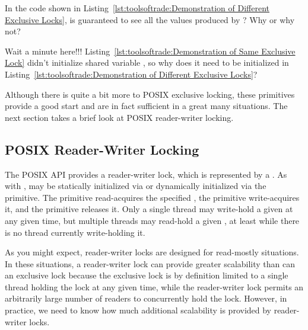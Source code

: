 \QuickQuiz{}
	In the code shown in
	Listing~\ref{lst:toolsoftrade:Demonstration of Different Exclusive Locks},
	is  guaranteed to see all the values produced
	by ?
	Why or why not?
 \QuickQuizEnd

\QuickQuiz{}
	Wait a minute here!!!
	Listing~\ref{lst:toolsoftrade:Demonstration of Same Exclusive Lock}
	didn't initialize shared variable ,
	so why does it need to be initialized in
	Listing~\ref{lst:toolsoftrade:Demonstration of Different Exclusive Locks}?
 \QuickQuizEnd

Although there is quite a bit more to POSIX exclusive locking, these
primitives provide a good start and are in fact sufficient in a great
many situations.
The next section takes a brief look at POSIX reader-writer locking.

\subsection{POSIX Reader-Writer Locking}
\label{sec:toolsoftrade:POSIX Reader-Writer Locking}

The POSIX API provides a reader-writer lock, which is represented by
a .
As with ,  may be statically
initialized via  or dynamically
initialized via the  primitive.
The  primitive read-acquires the
specified , the 
primitive write-acquires it, and the 
primitive releases it.
Only a single thread may write-hold a given 
at any given time, but multiple threads may read-hold a given
, at least while there is no thread
currently write-holding it.

As you might expect, reader-writer locks are designed for read-mostly
situations.
In these situations, a reader-writer lock can provide greater scalability
than can an exclusive lock because the exclusive lock is by definition
limited to a single thread holding the lock at any given time, while
the reader-writer lock permits
an arbitrarily large number of readers to concurrently hold the lock.
However, in practice, we need to know how much additional scalability is
provided by reader-writer locks.

